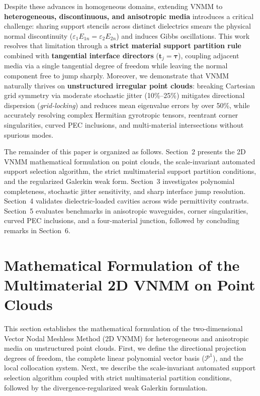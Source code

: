 \documentclass[11pt,a4paper]{article}
\begin{document}
Despite these advances in homogeneous domains, extending VNMM to \textbf{heterogeneous, discontinuous, and anisotropic media} introduces a critical challenge: sharing support stencils across distinct dielectrics smears the physical normal discontinuity ($\varepsilon_1 E_{1n} = \varepsilon_2 E_{2n}$) and induces Gibbs oscillations. This work resolves that limitation through a \textbf{strict material support partition rule} combined with \textbf{tangential interface directors} ($\mathbf{t}_j = \boldsymbol{\tau}$), coupling adjacent media via a single tangential degree of freedom while leaving the normal component free to jump sharply. Moreover, we demonstrate that VNMM naturally thrives on \textbf{unstructured irregular point clouds}: breaking Cartesian grid symmetry via moderate stochastic jitter (10\%--25\%) mitigates directional dispersion (\textit{grid-locking}) and reduces mean eigenvalue errors by over 50\%, while accurately resolving complex Hermitian gyrotropic tensors, reentrant corner singularities, curved PEC inclusions, and multi-material intersections without spurious modes.

The remainder of this paper is organized as follows. Section~2 presents the 2D VNMM mathematical formulation on point clouds, the scale-invariant automated support selection algorithm, the strict multimaterial support partition conditions, and the regularized Galerkin weak form. Section~3 investigates polynomial completeness, stochastic jitter sensitivity, and sharp interface jump resolution. Section~4 validates dielectric-loaded cavities across wide permittivity contrasts. Section~5 evaluates benchmarks in anisotropic waveguides, corner singularities, curved PEC inclusions, and a four-material junction, followed by concluding remarks in Section~6.

\section{Mathematical Formulation of the Multimaterial 2D VNMM on Point Clouds}

This section establishes the mathematical formulation of the two-dimensional Vector Nodal Meshless Method (2D VNMM) for heterogeneous and anisotropic media on unstructured point clouds. First, we define the directional projection degrees of freedom, the complete linear polynomial vector basis ($\mathcal{P}^1$), and the local collocation system. Next, we describe the scale-invariant automated support selection algorithm coupled with strict multimaterial partition conditions, followed by the divergence-regularized weak Galerkin formulation.
\end{document}
